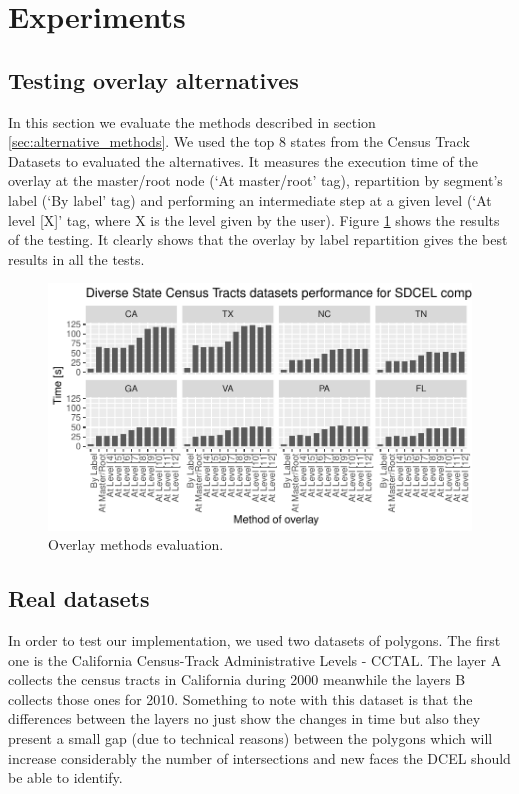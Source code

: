 \section{Experiments}

\subsection{Testing overlay alternatives}
In this section we evaluate the methods described in section \ref{sec:alternative_methods}.  We used the top 8 states from the Census Track Datasets to evaluated the alternatives.  It measures the execution time of the overlay at the master/root node (`At master/root' tag), repartition by segment's label (`By label' tag) and performing an intermediate step at a given level (`At level [X]' tag, where X is the level given by the user).  Figure \ref{fig:overlay_tester} shows the results of the testing.  It clearly shows that the overlay by label repartition gives the best results in all the tests.

\begin{figure}[!ht]
    \centering
    \includegraphics[width=\linewidth]{figures/experiments/Overlay_Tester/Overlay_Tester}
    \caption{Overlay methods evaluation.}\label{fig:overlay_tester}
\end{figure}

\subsection{Real datasets}
In order to test our implementation, we used two datasets of polygons.  The first one is the California Census-Track Administrative Levels - CCTAL. The layer A collects the census tracts in California during 2000 meanwhile the layers B collects those ones for 2010.  Something to note with this dataset is that the differences between the layers no just show the changes in time but also they present a small gap (due to technical reasons) between the polygons which will increase considerably the number of intersections and new faces the DCEL should be able to identify.

